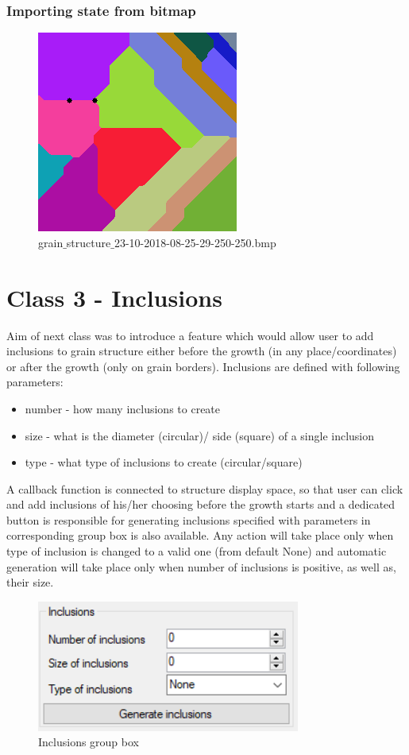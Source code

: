 \documentclass[a4paper, 11pt]{article}
\begin{document}
\subsubsection{Importing state from bitmap}
\begin{figure}[H]
\centering
  \includegraphics[]{ExportedBitmap}
  \caption{grain$\_$structure$\_$23-10-2018-08-25-29-250-250.bmp}
  \label{fig:boat1}
\end{figure}

\section*{Class 3 - Inclusions}
Aim of next class was to introduce a feature which would allow user to add inclusions to grain structure either before the growth (in any place/coordinates) or after the growth (only on grain borders).
Inclusions are defined with following parameters:
\begin{itemize}
\item number - how many inclusions to create
\item size - what is the diameter (circular)/ side (square) of a single inclusion
\item type - what type of inclusions to create (circular/square)
\end{itemize}
A callback function is connected to structure display space, so that user can click and add inclusions of his/her choosing before the growth starts and a dedicated button is responsible for generating inclusions specified with parameters in corresponding group box is also available.\newline
Any action will take place only when type of inclusion is changed to a valid one (from default None) and automatic generation will take place only when number of inclusions is positive, as well as, their size.
\begin{figure}[H]
\centering
  \includegraphics[]{InclusionsGroupBox}
  \caption{Inclusions group box}
  \label{fig:boat1}
\end{figure}
\end{document}
